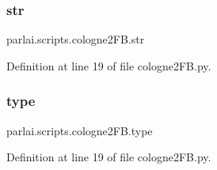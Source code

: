 \subsubsection{\texorpdfstring{str}{str}}
{\footnotesize\ttfamily parlai.\+scripts.\+cologne2\+F\+B.\+str}



Definition at line 19 of file cologne2\+F\+B.\+py.

\mbox{\label{namespaceparlai_1_1scripts_1_1cologne2FB_a63548cb270a13793932d035e97e5c85d}} 
\subsubsection{\texorpdfstring{type}{type}}
{\footnotesize\ttfamily parlai.\+scripts.\+cologne2\+F\+B.\+type}



Definition at line 19 of file cologne2\+F\+B.\+py.

